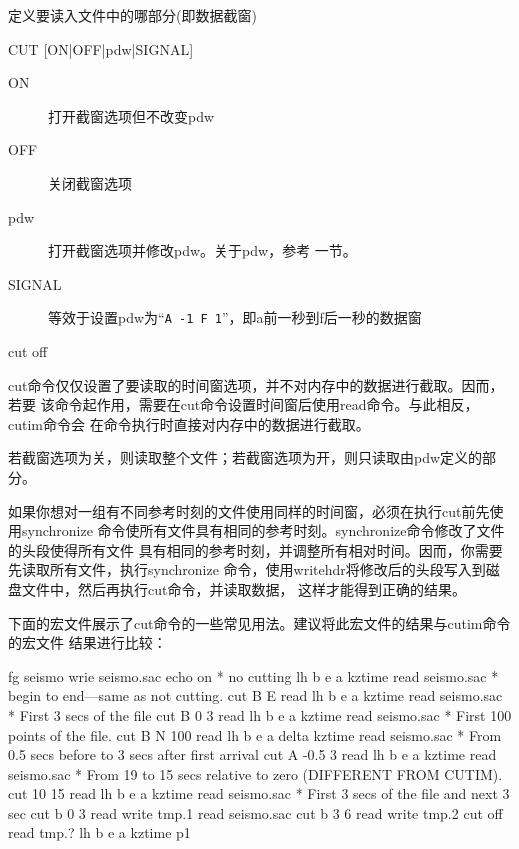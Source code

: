 \label{cmd:cut}

定义要读入文件中的哪部分(即数据截窗)

\begin{SACSTX}
CUT [ON|OFF|pdw|SIGNAL]
\end{SACSTX}

\begin{description}
\item [ON] 打开截窗选项但不改变pdw
\item [OFF] 关闭截窗选项
\item [pdw] 打开截窗选项并修改pdw。关于pdw，参考  一节。
\item [SIGNAL] 等效于设置pdw为``\texttt{A -1 F 1}''，即a前一秒到f后一秒的数据窗
\end{description}

\begin{SACDFT}
cut off
\end{SACDFT}

cut命令仅仅设置了要读取的时间窗选项，并不对内存中的数据进行截取。因而，若要
该命令起作用，需要在cut命令设置时间窗后使用read命令。与此相反，cutim命令会
在命令执行时直接对内存中的数据进行截取。

若截窗选项为关，则读取整个文件；若截窗选项为开，则只读取由pdw定义的部分。

如果你想对一组有不同参考时刻的文件使用同样的时间窗，必须在执行cut前先使用synchronize
命令使所有文件具有相同的参考时刻。synchronize命令修改了文件的头段使得所有文件
具有相同的参考时刻，并调整所有相对时间。因而，你需要先读取所有文件，执行synchronize
命令，使用writehdr将修改后的头段写入到磁盘文件中，然后再执行cut命令，并读取数据，
这样才能得到正确的结果。

下面的宏文件展示了cut命令的一些常见用法。建议将此宏文件的结果与cutim命令的宏文件
结果进行比较：
\begin{SACCode}
fg seismo
wrie seismo.sac
echo on
* no cutting
lh b e a kztime
read seismo.sac
* begin to end---same as not cutting.
cut B E
read
lh b e a kztime
read seismo.sac
* First 3 secs of the file
cut B 0 3
read
lh b e a kztime
read seismo.sac
* First 100 points of the file.
cut B N 100
read
lh b e a delta kztime
read seismo.sac
* From 0.5 secs before to 3 secs after first arrival
cut A -0.5 3
read
lh b e a kztime
read seismo.sac
* From 19 to 15 secs relative to zero (DIFFERENT FROM CUTIM).
cut 10 15
read
lh b e a kztime
read seismo.sac
* First 3 secs of the file and next 3 sec
cut b 0 3
read
write tmp.1
read seismo.sac
cut b 3 6
read
write tmp.2
cut off
read tmp.?
lh b e a kztime
p1
\end{SACCode}

